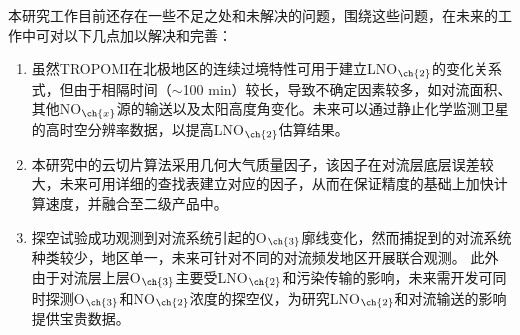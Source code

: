 本研究工作目前还存在一些不足之处和未解决的问题，围绕这些问题，在未来的工作中可对以下几点加以解决和完善：

\begin{enumerate}[label=（\arabic*）, labelindent=\parindent, nosep, leftmargin=0pt, widest=0, itemindent=*, topsep=0pt, partopsep=0pt, parsep=0pt]

\item 虽然TROPOMI在北极地区的连续过境特性可用于建立LNO$_{\ch{2}}$的变化关系式，但由于相隔时间（$\sim$100 min）较长，导致不确定因素较多，如对流面积、其他NO$_{\ch{x}}$源的输送以及太阳高度角变化。未来可以通过静止化学监测卫星的高时空分辨率数据，以提高LNO$_{\ch{2}}$估算结果。


\item 本研究中的云切片算法采用几何大气质量因子，该因子在对流层底层误差较大，未来可用详细的查找表建立对应的因子，从而在保证精度的基础上加快计算速度，并融合至二级产品中。

\item 探空试验成功观测到对流系统引起的O$_{\ch{3}}$廓线变化，然而捕捉到的对流系统种类较少，地区单一，未来可针对不同的对流频发地区开展联合观测。
此外由于对流层上层O$_{\ch{3}}$主要受LNO$_{\ch{2}}$和污染传输的影响，未来需开发可同时探测O$_{\ch{3}}$和NO$_{\ch{2}}$浓度的探空仪，为研究LNO$_{\ch{2}}$和对流输送的影响提供宝贵数据。

\end{enumerate}
